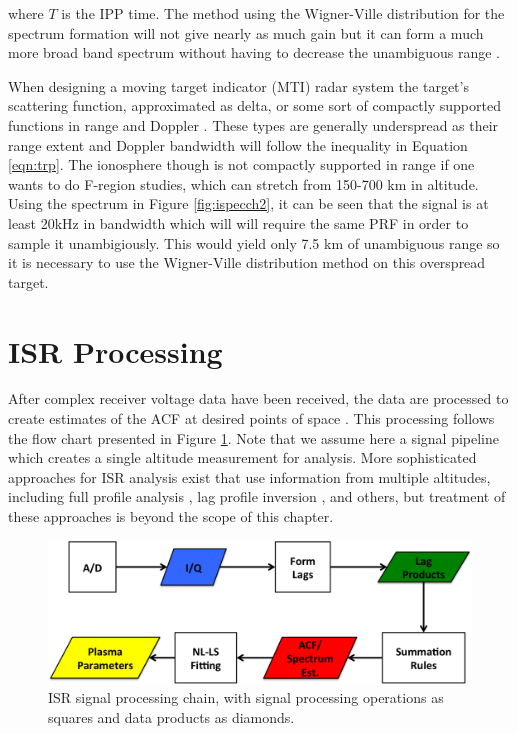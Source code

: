 \noindent where $T$ is the IPP time. The method using the Wigner-Ville distribution for the spectrum formation will not give nearly as much gain but it can form a much more broad band spectrum without having to decrease the unambiguous range \cite{richards2014fundamentals}.

When designing a moving target indicator (MTI) radar system the target's scattering function, approximated as delta, or some sort of compactly supported functions in range and Doppler \cite{richards2014fundamentals}. These types are generally underspread as their range extent and Doppler bandwidth will follow the inequality in Equation \ref{eqn:trp}. The ionosphere though is not compactly supported in range if one wants to do F-region studies, which can stretch from 150-700 km in altitude. Using the spectrum in Figure \ref{fig:ispecch2}, it can be seen that the signal is at least 20kHz in bandwidth which will will require the same PRF in order to sample it unambigiously. This would yield only 7.5 km of unambiguous range so it is necessary to use the Wigner-Ville distribution method on this overspread target. 





\section{ISR Processing}
\label{section:isrproc}
After complex receiver voltage data have been received, the data are processed to create estimates of the ACF at desired points of space \cite{farley1969,nygren1996}. This processing follows the flow chart presented in Figure \ref{fig:chain}.  Note that we assume here a signal pipeline which creates a single altitude measurement for analysis.  More sophisticated approaches for ISR analysis exist that use information from multiple altitudes, including full profile analysis \cite{RDS:RDS3308}, lag profile inversion \cite{Virtanen:20082vx}, and others, but treatment of these approaches is beyond the scope of this chapter.

\begin{figure}[!t]
\centering
\includegraphics[width=5.5in]{datastackchain}
\caption{ISR signal processing chain, with signal processing operations as squares and data products as diamonds.}
\label{fig:chain}
\end{figure}



